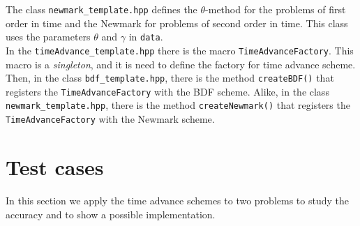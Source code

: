 \documentclass[english,a4paper]{article}
\begin{document}
  The class
  \verb"newmark_template.hpp"
  defines the $\theta$-method for
  the problems of first order in
  time and the Newmark for problems
  of  second order in time. This
  class uses the parameters $\theta$
  and $\gamma$  in \verb"data". \\

In the
\verb"timeAdvance_template.hpp"
there is the macro
\verb"TimeAdvanceFactory". 
This macro is a {\sl singleton}, and
it is need to define the factory for
time advance scheme.
Then, in the class \verb"bdf_template.hpp",
there is the method
\verb"createBDF()" that registers
the \verb"TimeAdvanceFactory" with
the BDF scheme.  Alike,  in the class \verb"newmark_template.hpp",
there is the method
\verb"createNewmark()" that registers
the \verb"TimeAdvanceFactory" with
the Newmark scheme. 
\section{Test cases}
In this section we apply the time advance schemes to two problems to study the accuracy  and to show a
possible implementation.
\end{document}
